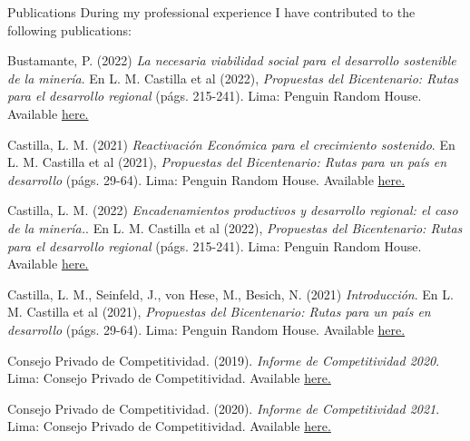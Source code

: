 \documentclass{resume} %
\begin{document}
\begin{rSection}{Publications}
During my professional experience I have contributed to the following publications:
\item Bustamante, P. (2022) \emph{La necesaria viabilidad social para el desarrollo sostenible de la minería}. En L. M. Castilla et al (2022), \textit{Propuestas del Bicentenario: Rutas para el desarrollo regional} (págs. 215-241). Lima: Penguin Random House. Available \href{https://www.casadellibro.com/ebook-propuestas-del-bicentenario-ebook/9786125068026/13125397}{here.} 
\item Castilla, L. M. (2021) \emph{Reactivación Económica para el crecimiento sostenido}. En L. M. Castilla et al (2021), \textit{Propuestas del Bicentenario: Rutas para un país en desarrollo} (págs. 29-64). Lima: Penguin Random House. Available \href{https://www.casadellibro.com/ebook-propuestas-del-bicentenario-ebook/9786124272813/12336851}{here.}
\item Castilla, L. M. (2022) \emph{Encadenamientos productivos y desarrollo regional: el caso de la minería.}.  En L. M. Castilla et al (2022), \textit{Propuestas del Bicentenario: Rutas para el desarrollo regional} (págs. 215-241). Lima: Penguin Random House. Available \href{https://www.casadellibro.com/ebook-propuestas-del-bicentenario-ebook/9786125068026/13125397}{here.} 
\item Castilla, L. M., Seinfeld, J., von Hese, M., Besich, N. (2021) \emph{Introducción}. En L. M. Castilla et al (2021), \textit{Propuestas del Bicentenario: Rutas para un país en desarrollo} (págs. 29-64). Lima: Penguin Random House. Available \href{https://www.casadellibro.com/ebook-propuestas-del-bicentenario-ebook/9786124272813/12336851}{here.}
\item Consejo Privado de Competitividad. (2019). \emph{Informe de Competitividad 2020}. Lima: Consejo Privado de Competitividad. Available \href{https://www.compite.pe/wp-content/uploads/2019/11/CPC_Peru_INC-2020_Libro-Web-Paginas.pdf}{here.}
\item Consejo Privado de Competitividad. (2020). \emph{Informe de Competitividad 2021}. Lima: Consejo Privado de Competitividad. Available \href{https://www.compite.pe/wp-content/uploads/2021/01/Informe-de-Competitividad-2021-CPC.pdf}{here.}
\end{rSection} 
\end{document}
